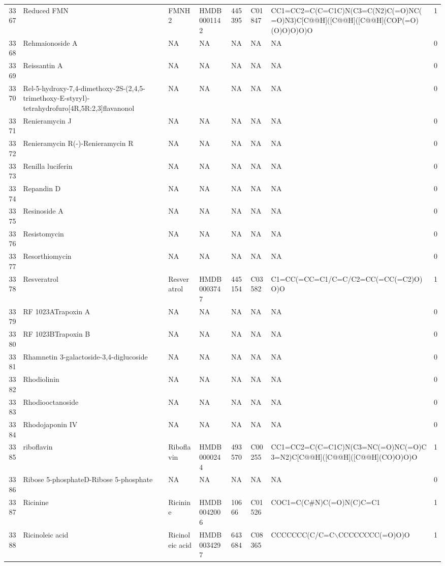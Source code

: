 \documentclass[a4paper]{article}
\begin{document}
\begin{longtable}{rlllllll}
  3367 & Reduced FMN & FMNH2 & HMDB0001142 & 445395 & C01847 & CC1=CC2=C(C=C1C)N(C3=C(N2)C(=O)NC(=O)N3)C[C@@H]([C@@H]([C@@H](COP(=O)(O)O)O)O)O & 1 \\ 
  3368 & Rehmaionoside A & NA & NA & NA & NA & NA & 0 \\ 
  3369 & Reissantin A & NA & NA & NA & NA & NA & 0 \\ 
  3370 & Rel-5-hydroxy-7,4-dimethoxy-2S-(2,4,5-trimethoxy-E-styryl)-tetrahydrofuro[4R,5R:2,3]flavanonol & NA & NA & NA & NA & NA & 0 \\ 
  3371 & Renieramycin J & NA & NA & NA & NA & NA & 0 \\ 
  3372 & Renieramycin R(-)-Renieramycin R & NA & NA & NA & NA & NA & 0 \\ 
  3373 & Renilla luciferin & NA & NA & NA & NA & NA & 0 \\ 
  3374 & Repandin D & NA & NA & NA & NA & NA & 0 \\ 
  3375 & Resinoside A & NA & NA & NA & NA & NA & 0 \\ 
  3376 & Resistomycin & NA & NA & NA & NA & NA & 0 \\ 
  3377 & Resorthiomycin & NA & NA & NA & NA & NA & 0 \\ 
  3378 & Resveratrol & Resveratrol & HMDB0003747 & 445154 & C03582 & C1=CC(=CC=C1/C=C/C2=CC(=CC(=C2)O)O)O & 1 \\ 
  3379 & RF 1023ATrapoxin A & NA & NA & NA & NA & NA & 0 \\ 
  3380 & RF 1023BTrapoxin B & NA & NA & NA & NA & NA & 0 \\ 
  3381 & Rhamnetin 3-galactoside-3,4-diglucoside & NA & NA & NA & NA & NA & 0 \\ 
  3382 & Rhodiolinin & NA & NA & NA & NA & NA & 0 \\ 
  3383 & Rhodiooctanoside & NA & NA & NA & NA & NA & 0 \\ 
  3384 & Rhodojaponin IV & NA & NA & NA & NA & NA & 0 \\ 
  3385 & riboflavin & Riboflavin & HMDB0000244 & 493570 & C00255 & CC1=CC2=C(C=C1C)N(C3=NC(=O)NC(=O)C3=N2)C[C@@H]([C@@H]([C@@H](CO)O)O)O & 1 \\ 
  3386 & Ribose 5-phosphateD-Ribose 5-phosphate & NA & NA & NA & NA & NA & 0 \\ 
  3387 & Ricinine & Ricinine & HMDB0042006 & 10666 & C01526 & COC1=C(C\#N)C(=O)N(C)C=C1 & 1 \\ 
  3388 & Ricinoleic acid & Ricinoleic acid & HMDB0034297 & 643684 & C08365 & CCCCCCC(C/C=C$\backslash$CCCCCCCC(=O)O)O & 1 \\ 

\end{longtable}
\end{document}
